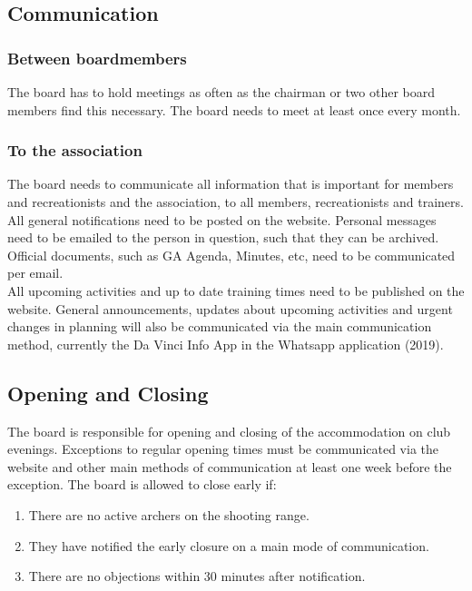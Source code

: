 \documentclass[a4paper]{article}
\begin{document}
\subsection{Communication}
\subsubsection{Between boardmembers}
The board has to hold meetings as often as the chairman or two other board members find this necessary. The board needs to meet at least once every month.

\subsubsection{To the association}
The board needs to communicate all information that is important for members and recreationists and the association, to all members, recreationists and trainers. All general notifications need to be posted on the website. Personal messages need to be emailed to the person in question, such that they can be archived. Official documents, such as GA Agenda, Minutes, etc, need to be communicated per email. \\
 
All upcoming activities and up to date training times need to be published on the website. 
General announcements, updates about upcoming activities and urgent changes in planning will also be communicated via the main communication method, currently the Da Vinci Info App in the Whatsapp application {\g (2019)}.

\subsection{Opening and Closing}
The board is responsible for opening and closing of the accommodation on club evenings. Exceptions to regular opening times must be communicated via the website and other main methods of communication at least one week before the exception. The board is allowed to close early if:

\begin{enumerate}
\item There are no active archers on the shooting range.
\item They have notified the early closure on a main mode of communication.
\item There are no objections within 30 minutes after notification.
\end{enumerate}
\end{document}
